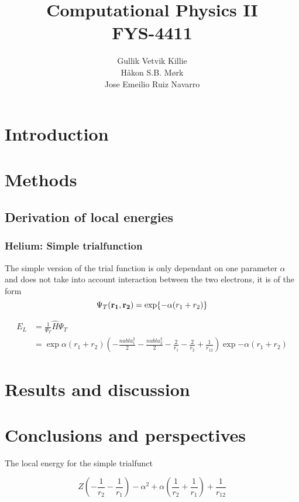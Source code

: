 \documentclass[11pt]{article}
\title{ Computational Physics II \\ FYS-4411 }
\author{Gullik Vetvik Killie\\
		Håkon S.B. Mørk\\
		Jose Emeilio Ruiz Navarro
		}
\begin{document}
\maketitle


\section{Introduction}

\section{Methods}
	\subsection{Derivation of local energies}
		\subsubsection{Helium: Simple trialfunction}
		The simple version of the trial function is only dependant on one parameter \( \alpha \) and does not take into account interaction between the two electrons, it is of the form 
		\[ \Psi_T (\vb{r_1}, \vb{r_2}) = \exp{ -\alpha (r_1 + r_2) } \]

		\begin{align}
		E_L &= \frac{1}{ \Psi_T } \hat{H} \Psi_T 
		\\
		&=	\exp{ \alpha (r_1 + r_2) } \left( -\frac{nabla_1^2}{ 2 } - \frac{nabla_2^2}{ 2 } - \frac{2}{r_1}  -\frac{2}{r_2} +  \frac{1}{r_{12}} \right)   \exp{ -\alpha (r_1 + r_2) }
		\end{align} 
	
\section{Results and discussion}

\section{Conclusions and perspectives}

\appendix


	The local energy for the simple trialfunct

	\[
	Z \left(- \frac{1}{r_{2}} - \frac{1}{r_{1}}\right) - \alpha^{2} + \alpha \left(\frac{1}{r_{2}} + \frac{1}{r_{1}}\right) + \frac{1}{r_{12}}
	\]
\end{document}
